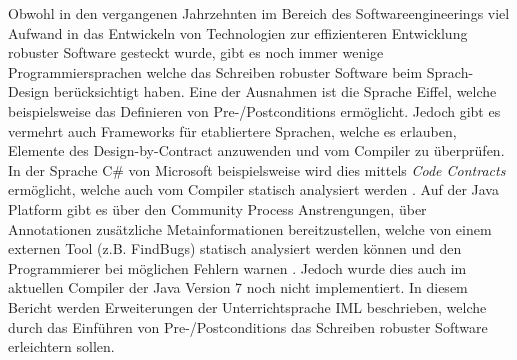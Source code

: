 Obwohl in den vergangenen Jahrzehnten im Bereich des Softwareengineerings viel 
Aufwand in das Entwickeln von Technologien zur effizienteren Entwicklung robuster
Software gesteckt wurde, gibt es noch immer wenige Programmiersprachen welche 
das Schreiben robuster Software beim Sprach-Design berücksichtigt haben. Eine der Ausnahmen 
ist die Sprache Eiffel, welche beispielsweise das Definieren von Pre-/Postconditions
ermöglicht. Jedoch gibt es vermehrt auch Frameworks für etabliertere Sprachen, welche 
es erlauben, Elemente des Design-by-Contract anzuwenden und vom Compiler zu überprüfen.
In der Sprache C\# von Microsoft beispielsweise wird dies mittels \textit{Code Contracts}
 ermöglicht, welche auch vom Compiler statisch analysiert werden \cite{MS:CodeContracts}.
Auf der Java Platform gibt es über den Community Process Anstrengungen, über Annotationen
zusätzliche Metainformationen bereitzustellen, welche von einem externen Tool (z.B. FindBugs) statisch analysiert 
werden können und den Programmierer bei möglichen Fehlern warnen \cite{JSR:305}. Jedoch wurde dies
auch im aktuellen Compiler der Java Version 7 noch nicht implementiert. In diesem Bericht werden Erweiterungen
der Unterrichtsprache IML beschrieben, welche durch das Einführen von Pre-/Postconditions das Schreiben robuster Software erleichtern sollen.

